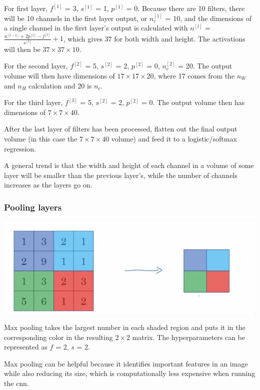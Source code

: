 \documentclass[12pt]{article}
\begin{document}
For first layer, $f^{[1]}$ = 3, $s^{[1]}$ = 1, $p^{[1]}$ = 0. Because there are 10 filters,
there will be 10 channels in the first layer output, or $n_c^{[1]}$ = 10, and the dimensions
of a single channel in the first layer's output is calculated with $n^{[l]}$ =
$\frac{n^{[l-1]}+2p^{[l]}-f^{[l]}}{s^{[l]}} + 1$, which gives 37 for both width and height.
The activations will then be $37 \times 37 \times 10$.

For the second layer, $f^{[2]}$ = 5, $s^{[2]}$ = 2, $p^{[2]}$ = 0, $n_c^{[2]}$ = 20. The
output volume will then have dimensions of $17 \times 17 \times 20$, where 17 comes from
the $n_W$ and $n_H$ calculation and $20$ is $n_c$.

For the third layer, $f^{[3]}$ = 5, $s^{[2]}$ = 2, $p^{[2]}$ = 0. The output volume
then has dimensions of $7 \times 7 \times 40$.

After the last layer of filters has been processed, flatten out the final output volume
(in this case the $7 \times 7 \times 40$ volume) and feed it to a logistic/softmax regression.

A general trend is that the width and height of each channel in a volume of some layer will
be smaller than the previous layer's, while the number of channels increases as the layers go on.

\subsubsection{Pooling layers}

\includegraphics[scale=.5]{images/max-pooling.png}

Max pooling takes the largest number in each shaded region and puts it in the corresponding
color in the resulting $2 \times 2$ matrix. The hyperparameters can be represented as $f$ = 2,
$s$ = 2.

Max pooling can be helpful because it identifies important features in an image while also
reducing its size, which is computationally less expensive when running the cnn.
\end{document}
